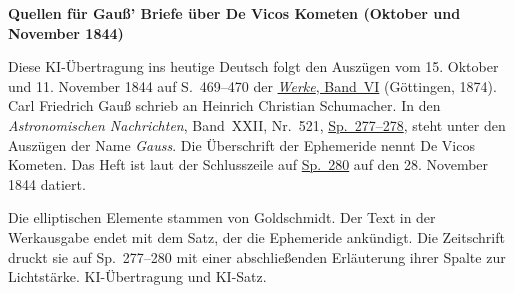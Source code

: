 \clearpage\thispagestyle{empty}
\begin{center}\textbf{Quellen für Gauß’ Briefe über De Vicos Kometen (Oktober und November 1844)}\end{center}
\noindent Diese KI-Übertragung ins heutige Deutsch folgt den Auszügen vom 15. Oktober und 11. November 1844 auf S.~469--470 der \href{https://gdz.sub.uni-goettingen.de/id/PPN236007467}{\textit{Werke}, Band~VI} (Göttingen, 1874). Carl Friedrich Gauß schrieb an Heinrich Christian Schumacher. In den \textit{Astronomischen Nachrichten}, Band~XXII, Nr.~521, \href{https://api.digitale-sammlungen.de/iiif/image/v2/bsb10049447_00147/full/1800,/0/default.jpg}{Sp.~277--278}, steht unter den Auszügen der Name \textit{Gauss}. Die Überschrift der Ephemeride nennt De Vicos Kometen. Das Heft ist laut der Schlusszeile auf \href{https://api.digitale-sammlungen.de/iiif/image/v2/bsb10049447_00148/full/1800,/0/default.jpg}{Sp.~280} auf den 28. November 1844 datiert.
\par\smallskip\noindent Die elliptischen Elemente stammen von Goldschmidt. Der Text in der Werkausgabe endet mit dem Satz, der die Ephemeride ankündigt. Die Zeitschrift druckt sie auf Sp.~277--280 mit einer abschließenden Erläuterung ihrer Spalte zur Lichtstärke. KI-Übertragung und KI-Satz.
\clearpage
